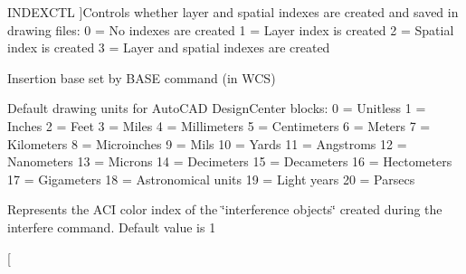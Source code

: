 \begin{Desc}
\begin{description}
{I\+N\+D\+E\+X\+C\+TL\hypertarget{class_c_a_d_header_abd894aab7aa85b4c4634e67fb93d6886a943570b77842628b772b43aded0b1b05}{}\label{class_c_a_d_header_abd894aab7aa85b4c4634e67fb93d6886a943570b77842628b772b43aded0b1b05}
}]Controls whether layer and spatial indexes are created and saved in drawing files\+: 0 = No indexes are created 1 = Layer index is created 2 = Spatial index is created 3 = Layer and spatial indexes are created \item[{\em 
I\+N\+S\+B\+A\+SE\hypertarget{class_c_a_d_header_abd894aab7aa85b4c4634e67fb93d6886abac70dd41c3ee084f5c49b9f6b732041}{}\label{class_c_a_d_header_abd894aab7aa85b4c4634e67fb93d6886abac70dd41c3ee084f5c49b9f6b732041}
}]Insertion base set by B\+A\+SE command (in W\+CS) \item[{\em 
I\+N\+S\+U\+N\+I\+TS\hypertarget{class_c_a_d_header_abd894aab7aa85b4c4634e67fb93d6886a5d91e3ef97387612b04d10c8b85595a4}{}\label{class_c_a_d_header_abd894aab7aa85b4c4634e67fb93d6886a5d91e3ef97387612b04d10c8b85595a4}
}]Default drawing units for Auto\+C\+AD Design\+Center blocks\+: 0 = Unitless 1 = Inches 2 = Feet 3 = Miles 4 = Millimeters 5 = Centimeters 6 = Meters 7 = Kilometers 8 = Microinches 9 = Mils 10 = Yards 11 = Angstroms 12 = Nanometers 13 = Microns 14 = Decimeters 15 = Decameters 16 = Hectometers 17 = Gigameters 18 = Astronomical units 19 = Light years 20 = Parsecs \item[{\em 
I\+N\+T\+E\+R\+F\+E\+R\+E\+C\+O\+L\+OR\hypertarget{class_c_a_d_header_abd894aab7aa85b4c4634e67fb93d6886afd091aea346a0a74d2b8caad565e51c2}{}\label{class_c_a_d_header_abd894aab7aa85b4c4634e67fb93d6886afd091aea346a0a74d2b8caad565e51c2}
}]Represents the A\+CI color index of the \char`\"{}interference objects\char`\"{} created during the interfere command. Default value is 1 \item[{\em 
}
\end{description}
\end{Desc}
